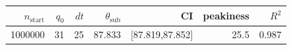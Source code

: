 \begin{tabular}{r r r r r r r}
\hline
$n_{\mathrm{start}}$ & $q_0$ & $dt$ & $\theta_{\mathrm{sub}}$ & CI & peakiness & $R^2$ \\
\hline
1000000 & 31 & 25 & 87.833 & [87.819,87.852] & 25.5 & 0.987 \\
\hline
\end{tabular}
